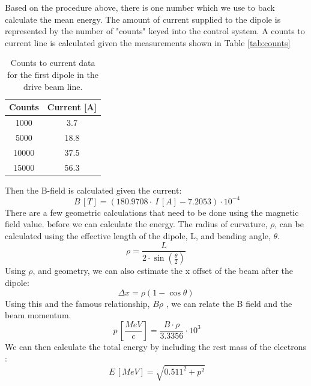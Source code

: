 Based on the procedure above, there is one number which we 
use to back calculate the mean energy. The amount of current
supplied to the dipole is represented by the number of "counts"
keyed into the control system. A counts to current line
is calculated given the measurements shown in Table \ref{tab:counts}
\begin{table}
\begin{center}
	\begin{tabular}{||c c||} 
		\hline
		Counts & Current [A] \\ [0.5ex] 
		\hline\hline
		1000 & 3.7 \\ 
		\hline
		5000 & 18.8 \\
		\hline
		10000 & 37.5 \\
		\hline
		15000 & 56.3 \\
		\hline
		
	\end{tabular}
\end{center}
\caption{Counts to current data for the first dipole in the drive beam line.}
\end{table}\label{tab:counts}
Then the B-field is calculated given the current: 
\begin{equation}
	\SI{}{B\,[T]} = (180.9708\cdot \SI{}{I\,[A]} - 7.2053)\cdot 10^{-4}
\end{equation}
There are a few geometric calculations that need to be done using the magnetic field value. 
before we can calculate the energy. 
The radius of curvature, $\rho$, 
can be calculated using the effective length of the dipole, L, and bending angle, $\theta$.
\begin{equation}
	\rho = \frac{L}{2\cdot \sin(\frac{\theta}{2})}
\end{equation}
Using $\rho$, and geometry, we can also estimate the x offset of the
beam after the dipole: 
\begin{equation}
	\Delta x = \rho \left( 1- \cos\theta \right)
\end{equation}
Using this and the famous relationship, $B\rho$ \cite{Wiedemann},
we can relate the B field and the beam momentum. 
\begin{equation}
	\SI{}{p\,\left[\frac{MeV}{c}\right]} = \frac{B\cdot \rho}{3.3356}\cdot 10^3
\end{equation}
We can then calculate the total energy by including the rest mass of the electrons \cite{Griffiths}:
\begin{equation}
	\SI{}{E\,[MeV]} = \sqrt{0.511^2+p^2}
\end{equation}\label{eq:energy}

